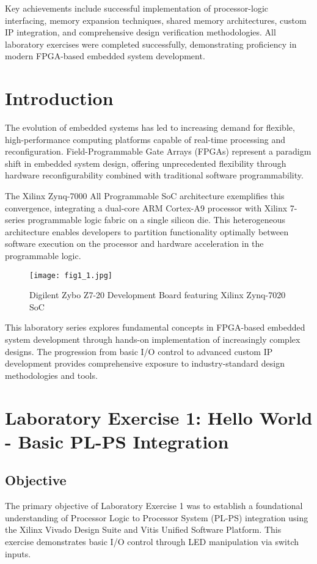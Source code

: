 \documentclass[11pt,a4paper]{article}
\begin{document}
Key achievements include successful implementation of processor-logic interfacing, memory expansion techniques, shared memory architectures, custom IP integration, and comprehensive design verification methodologies. All laboratory exercises were completed successfully, demonstrating proficiency in modern FPGA-based embedded system development.

\section{Introduction}

The evolution of embedded systems has led to increasing demand for flexible, high-performance computing platforms capable of real-time processing and reconfiguration. Field-Programmable Gate Arrays (FPGAs) represent a paradigm shift in embedded system design, offering unprecedented flexibility through hardware reconfigurability combined with traditional software programmability.

The Xilinx Zynq-7000 All Programmable SoC architecture exemplifies this convergence, integrating a dual-core ARM Cortex-A9 processor with Xilinx 7-series programmable logic fabric on a single silicon die. This heterogeneous architecture enables developers to partition functionality optimally between software execution on the processor and hardware acceleration in the programmable logic.

\begin{figure}[H]
    \centering
    \texttt{[image: fig1\_1.jpg]}
    \caption{Digilent Zybo Z7-20 Development Board featuring Xilinx Zynq-7020 SoC}
    \label{fig:zybo_board}
\end{figure}

This laboratory series explores fundamental concepts in FPGA-based embedded system development through hands-on implementation of increasingly complex designs. The progression from basic I/O control to advanced custom IP development provides comprehensive exposure to industry-standard design methodologies and tools.

\section{Laboratory Exercise 1: Hello World - Basic PL-PS Integration}

\subsection{Objective}
The primary objective of Laboratory Exercise 1 was to establish a foundational understanding of Processor Logic to Processor System (PL-PS) integration using the Xilinx Vivado Design Suite and Vitis Unified Software Platform. This exercise demonstrates basic I/O control through LED manipulation via switch inputs.
\end{document}

